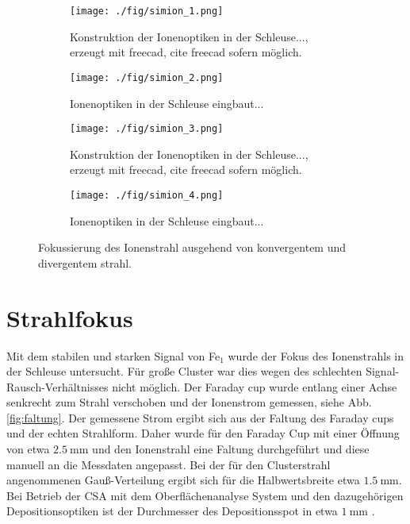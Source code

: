 \begin{figure}
    \begin{subfigure}[h]{1\textwidth}
      \texttt{[image: ./fig/simion\_1.png]}
      \caption{Konstruktion der Ionenoptiken in der Schleuse..., erzeugt mit freecad, cite freecad sofern möglich.}
      \label{fig:simion_1}
    \end{subfigure}\hfill
    \begin{subfigure}[t]{1\textwidth}
      \texttt{[image: ./fig/simion\_2.png]}
      \caption{Ionenoptiken in der Schleuse eingbaut...}
      \label{fig:simion_2}
    \end{subfigure}
    \begin{subfigure}[h]{1\textwidth}
        \texttt{[image: ./fig/simion\_3.png]}
        \caption{Konstruktion der Ionenoptiken in der Schleuse..., erzeugt mit freecad, cite freecad sofern möglich.}
        \label{fig:simion_3}
    \end{subfigure}\hfill
    \begin{subfigure}[t]{1\textwidth}
        \texttt{[image: ./fig/simion\_4.png]}
        \caption{Ionenoptiken in der Schleuse eingbaut...}
        \label{fig:simion_4}
    \end{subfigure}
    \caption{Fokussierung des Ionenstrahl ausgehend von konvergentem und divergentem strahl.} 
    \label{fig:simion_param}
\end{figure}

\section{Strahlfokus}
Mit dem stabilen und starken Signal von Fe$_1$ wurde der Fokus des Ionenstrahls in der Schleuse untersucht.
Für große Cluster war dies wegen des schlechten Signal-Rausch-Verhältnisses nicht möglich.
Der Faraday cup wurde entlang einer Achse senkrecht zum Strahl verschoben und der Ionenstrom gemessen, siehe Abb. \ref{fig:faltung}.
Der gemessene Strom ergibt sich aus der Faltung des Faraday cups und der echten Strahlform.
Daher wurde für den Faraday Cup mit einer Öffnung von etwa $\SI{2.5}{\mm}$ und den Ionenstrahl eine Faltung durchgeführt und diese manuell an die Messdaten angepasst.
Bei der für den Clusterstrahl angenommenen Gauß-Verteilung ergibt sich für die Halbwertsbreite etwa $\SI{1.5}{\mm}$. 
Bei Betrieb der CSA mit dem Oberflächenanalyse System und den dazugehörigen Depositionsoptiken ist der Durchmesser des Depositionsspot in etwa $\SI{1}{\mm}$ \cite[S. 40]{gronhagen}.

